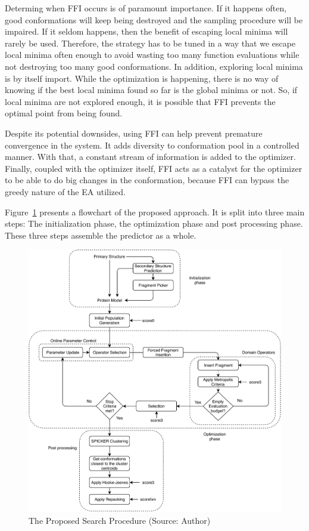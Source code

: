 Determing when \ac{FFI}
occurs is of paramount importance. If it happens often, good conformations will
keep being destroyed and the sampling procedure will be impaired. If it seldom 
happens, then the benefit of escaping local minima will rarely be used. Therefore,
the strategy has to be tuned in a way that we escape local minima often enough
to avoid wasting too many function evaluations while not destroying too many
good conformations. In addition, exploring local minima is by itself import.
While the optimization is happening, there is no way of knowing if the best local
minima found so far is the global minima or not. So, if local minima are not
explored enough, it is possible that \ac{FFI} prevents the optimal point from
being found.

Despite its potential downsides, using \ac{FFI} can help prevent premature
convergence in the system. It adds diversity to conformation pool in a controlled
manner. With that, a constant stream of information is added to the optimizer.
Finally, coupled with the optimizer itself, \ac{FFI} acts as a catalyst for the
optimizer to be able to do big changes in the conformation, because \ac{FFI} can
bypass the greedy nature of the \ac{EA} utilized.

Figure~\ref{fig:search-procedure} presents a flowchart of the proposed
approach. It is split into three main steps: The initialization phase, the
optimization phase and post processing phase. These three steps assemble the
predictor as a whole.

\begin{figure}
    \centering
    \includegraphics[width=\linewidth]{Figuras/search-procedure.pdf}
    \caption{The Proposed Search Procedure (Source: Author)}
    \label{fig:search-procedure}
\end{figure}

